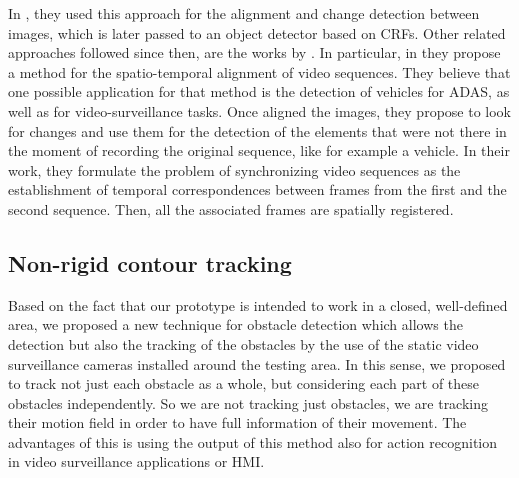 In \cite{vallespi2012prior}, they used this approach for the alignment and change detection between images, which is later passed to an object detector based on \acp{CRF}. Other related approaches followed since then, are the works by \cite{diego2011video, evangelidis2011slice, evangelidis2011efficient}. In particular, in \cite{diego2011video} they propose a method for the spatio-temporal alignment of video sequences. They believe that one possible application for that method is the detection of vehicles for \ac{ADAS}, as well as for video-surveillance tasks. Once aligned the images, they propose to look for changes and use them for the detection of the elements that were not there in the moment of recording the original sequence, like for example a vehicle. In their work, they formulate the problem of synchronizing video sequences as the establishment of temporal correspondences between frames from the first and the second sequence. Then, all the associated frames are spatially registered.

\subsection{Non-rigid contour tracking}\label{ch:chapter00_02_02}

Based on the fact that our prototype is intended to work in a closed, well-defined area, we proposed a new technique for obstacle detection which allows the detection but also the tracking of the obstacles by the use of the static video surveillance cameras installed around the testing area. In this sense, we proposed to track not just each obstacle as a whole, but considering each part of these obstacles independently. So we are not tracking just obstacles, we are tracking their motion field in order to have full information of their movement. The advantages of this is using the output of this method also for action recognition in video surveillance applications or \ac{HMI}.


